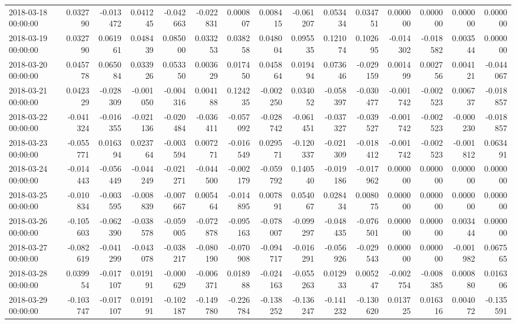 \begin{tabular}{lrrrrrrrrrrrrrr}
2018-03-18 00:00:00 & 0.032790 & -0.013472 & 0.041245 & -0.042663 & -0.022831 & 0.000807 & 0.008415 & -0.061207 & 0.053434 & 0.034751 & 0.000000 & 0.000000 & 0.000000 & 0.000000 \\
2018-03-19 00:00:00 & 0.032790 & 0.061961 & 0.048439 & 0.085000 & 0.033253 & 0.038258 & 0.048004 & 0.095535 & 0.121074 & 0.102695 & -0.014302 & -0.018582 & 0.003544 & 0.000000 \\
2018-03-20 00:00:00 & 0.045778 & 0.065084 & 0.033926 & 0.053350 & 0.003629 & 0.017450 & 0.045864 & 0.019494 & 0.073646 & -0.029159 & 0.001499 & 0.002756 & 0.004121 & -0.044067 \\
2018-03-21 00:00:00 & 0.042329 & -0.028309 & -0.001050 & -0.004316 & 0.004188 & 0.124235 & -0.002250 & 0.034052 & -0.058397 & -0.030477 & -0.001742 & -0.002523 & 0.006737 & -0.018857 \\
2018-03-22 00:00:00 & -0.041324 & -0.016355 & -0.021136 & -0.020484 & -0.036411 & -0.057092 & -0.028742 & -0.061451 & -0.037327 & -0.039527 & -0.001742 & -0.002523 & -0.000230 & -0.018857 \\
2018-03-23 00:00:00 & -0.055771 & 0.016394 & 0.023764 & -0.003594 & 0.007271 & -0.016549 & 0.029571 & -0.120337 & -0.021309 & -0.018412 & -0.001742 & -0.002523 & -0.001812 & 0.063491 \\
2018-03-24 00:00:00 & -0.014443 & -0.056449 & -0.044249 & -0.021271 & -0.044500 & -0.002179 & -0.059792 & 0.140540 & -0.019186 & -0.017962 & 0.000000 & 0.000000 & 0.000000 & 0.000000 \\
2018-03-25 00:00:00 & -0.010834 & -0.003595 & -0.008839 & -0.007667 & 0.005464 & -0.014895 & 0.007891 & 0.054067 & 0.028434 & 0.008075 & 0.000000 & 0.000000 & 0.000000 & 0.000000 \\
2018-03-26 00:00:00 & -0.105603 & -0.062390 & -0.038578 & -0.059005 & -0.072878 & -0.095163 & -0.078007 & -0.099297 & -0.048435 & -0.076501 & 0.000000 & 0.000000 & 0.003444 & 0.000000 \\
2018-03-27 00:00:00 & -0.082619 & -0.041299 & -0.043078 & -0.038217 & -0.080190 & -0.070908 & -0.094717 & -0.016291 & -0.056926 & -0.029543 & 0.000000 & 0.000000 & -0.001982 & 0.067565 \\
2018-03-28 00:00:00 & 0.039954 & -0.017107 & 0.019191 & -0.000629 & -0.006371 & 0.018988 & -0.024163 & -0.055263 & 0.012933 & 0.005247 & -0.002754 & -0.008385 & 0.000880 & 0.016306 \\
2018-03-29 00:00:00 & -0.103747 & -0.017107 & 0.019191 & -0.102187 & -0.149780 & -0.226784 & -0.138252 & -0.136247 & -0.141232 & -0.130620 & 0.013725 & 0.016316 & 0.004072 & -0.135591 \\

\end{tabular}
